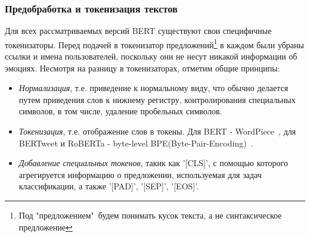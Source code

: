 \documentclass{article}
\begin{document}
\subsubsection{Предобработка и токенизация текстов}
Для всех рассматриваемых версий BERT существуют свои специфичные токенизаторы. Перед подачей в токенизатор предложений\footnote{Под "предложением"\ будем понимать кусок текста, а не синтаксическое предложение} в каждом были убраны ссылки и имена пользователей, поскольку они не несут никакой информации об эмоциях. Несмотря на разницу в токенизаторах, отметим общие принципы: \\
\begin{itemize}
    \item {\itshape Нормализация}, т.е. приведение к нормальному виду, что обычно делается путем приведения слов к нижнему регистру, контролирования специальных символов, в том числе, удаление пробельных символов.
    \item {\itshape Токенизация}, т.е. отображение слов в токены. Для BERT - WordPiece~\cite{yonghui}, для BERTweet и RoBERTa - byte-level BPE(Byte-Pair-Encoding)~\cite{roberta}.
    \item{\itshape Добавление специальных токенов}, такик как '[CLS]', с помощью которого агрегируется информацию о предложении, используемая для задач классификации, а также '[PAD]', '[SEP]', '[EOS]'.   
\end{itemize}
\end{document}
